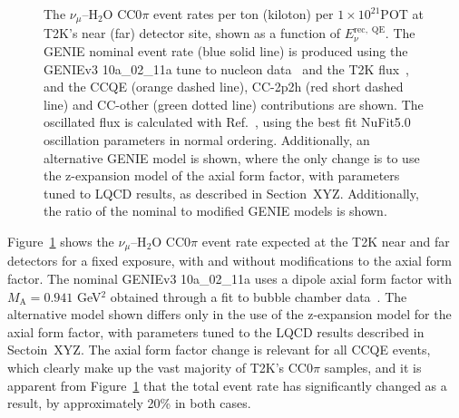 \begin{figure}[htbp]
  \centering
  \captionsetup[subfloat]{captionskip=-5pt}
  \hspace{75pt}
  \vspace{11pt}
  \caption{The $\nu_{\mu}$--H$_{2}$O CC0$\pi$ event rates per ton (kiloton) per $1\times10^{21}$POT at T2K's near (far) detector site, shown as a function of $E^{\mathrm{rec,\;QE}}_{\nu}$. The GENIE nominal event rate (blue solid line) is produced using the GENIEv3 10a\_02\_11a tune to nucleon data~\addcite{} and the T2K flux~\addcite{}, and the CCQE (orange dashed line), CC-2p2h (red short dashed line) and CC-other (green dotted line) contributions are shown. The oscillated flux is calculated with Ref.~\addcite{}, using the best fit NuFit5.0 oscillation parameters in normal ordering. Additionally, an alternative GENIE model is shown, where the only change is to use the z-expansion model of the axial form factor, with parameters tuned to LQCD results, as described in Section~XYZ. Additionally, the ratio of the nominal to modified GENIE models is shown.}
  \label{fig:t2k_impact}
\end{figure}
Figure~\ref{fig:t2k_impact} shows the $\nu_{\mu}$--H$_{2}$O CC0$\pi$ event rate expected at the T2K near and far detectors for a fixed exposure, with and without modifications to the axial form factor. The nominal GENIEv3 10a\_02\_11a uses a dipole axial form factor with $M_{\mathrm{A}} = 0.941$ GeV$^2$ obtained through a fit to bubble chamber data~\addcite{}. The alternative model shown differs only in the use of the z-expansion model for the axial form factor, with parameters tuned to the LQCD results described in Sectoin~XYZ. The axial form factor change is relevant for all CCQE events, which clearly make up the vast majority of T2K's CC0$\pi$ samples, and it is apparent from Figure~\ref{fig:t2k_impact} that the total event rate has significantly changed as a result, by approximately 20\% in both cases.

